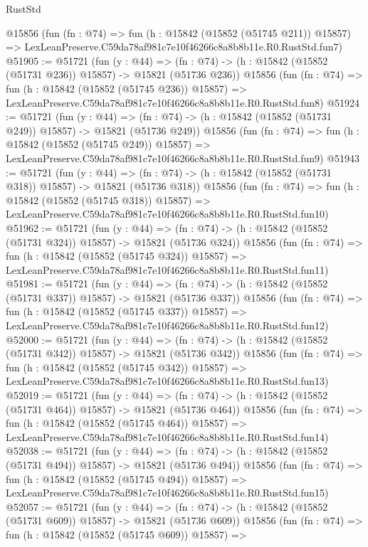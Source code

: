 \begin{lexlean}{RustStd}
\begin{coremodule}
    @15856
    (fun (fn : @74) =>
    fun (h : @15842 (@15852 (@51745 @211)) @15857) =>
    LexLeanPreserve.C59da78af981c7e10f46266c8a8b8b11e.R0.RustStd.fun7)
@51905 := @51721
    (fun (y : @44) =>
    (fn : @74) -> (h : @15842 (@15852 (@51731 @236)) @15857) -> @15821 (@51736 @236))
    @15856
    (fun (fn : @74) =>
    fun (h : @15842 (@15852 (@51745 @236)) @15857) =>
    LexLeanPreserve.C59da78af981c7e10f46266c8a8b8b11e.R0.RustStd.fun8)
@51924 := @51721
    (fun (y : @44) =>
    (fn : @74) -> (h : @15842 (@15852 (@51731 @249)) @15857) -> @15821 (@51736 @249))
    @15856
    (fun (fn : @74) =>
    fun (h : @15842 (@15852 (@51745 @249)) @15857) =>
    LexLeanPreserve.C59da78af981c7e10f46266c8a8b8b11e.R0.RustStd.fun9)
@51943 := @51721
    (fun (y : @44) =>
    (fn : @74) -> (h : @15842 (@15852 (@51731 @318)) @15857) -> @15821 (@51736 @318))
    @15856
    (fun (fn : @74) =>
    fun (h : @15842 (@15852 (@51745 @318)) @15857) =>
    LexLeanPreserve.C59da78af981c7e10f46266c8a8b8b11e.R0.RustStd.fun10)
@51962 := @51721
    (fun (y : @44) =>
    (fn : @74) -> (h : @15842 (@15852 (@51731 @324)) @15857) -> @15821 (@51736 @324))
    @15856
    (fun (fn : @74) =>
    fun (h : @15842 (@15852 (@51745 @324)) @15857) =>
    LexLeanPreserve.C59da78af981c7e10f46266c8a8b8b11e.R0.RustStd.fun11)
@51981 := @51721
    (fun (y : @44) =>
    (fn : @74) -> (h : @15842 (@15852 (@51731 @337)) @15857) -> @15821 (@51736 @337))
    @15856
    (fun (fn : @74) =>
    fun (h : @15842 (@15852 (@51745 @337)) @15857) =>
    LexLeanPreserve.C59da78af981c7e10f46266c8a8b8b11e.R0.RustStd.fun12)
@52000 := @51721
    (fun (y : @44) =>
    (fn : @74) -> (h : @15842 (@15852 (@51731 @342)) @15857) -> @15821 (@51736 @342))
    @15856
    (fun (fn : @74) =>
    fun (h : @15842 (@15852 (@51745 @342)) @15857) =>
    LexLeanPreserve.C59da78af981c7e10f46266c8a8b8b11e.R0.RustStd.fun13)
@52019 := @51721
    (fun (y : @44) =>
    (fn : @74) -> (h : @15842 (@15852 (@51731 @464)) @15857) -> @15821 (@51736 @464))
    @15856
    (fun (fn : @74) =>
    fun (h : @15842 (@15852 (@51745 @464)) @15857) =>
    LexLeanPreserve.C59da78af981c7e10f46266c8a8b8b11e.R0.RustStd.fun14)
@52038 := @51721
    (fun (y : @44) =>
    (fn : @74) -> (h : @15842 (@15852 (@51731 @494)) @15857) -> @15821 (@51736 @494))
    @15856
    (fun (fn : @74) =>
    fun (h : @15842 (@15852 (@51745 @494)) @15857) =>
    LexLeanPreserve.C59da78af981c7e10f46266c8a8b8b11e.R0.RustStd.fun15)
@52057 := @51721
    (fun (y : @44) =>
    (fn : @74) -> (h : @15842 (@15852 (@51731 @609)) @15857) -> @15821 (@51736 @609))
    @15856
    (fun (fn : @74) =>
    fun (h : @15842 (@15852 (@51745 @609)) @15857) =>

\end{coremodule}
\end{lexlean}
